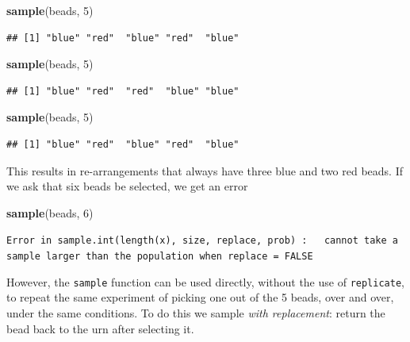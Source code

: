 \documentclass[
  openany]{book}
\newenvironment{Shaded}{\begin{snugshade}}{\end{snugshade}}
\newcommand{\DecValTok}[1]{\textcolor[rgb]{0.00,0.00,0.81}{#1}}
\newcommand{\KeywordTok}[1]{\textcolor[rgb]{0.13,0.29,0.53}{\textbf{#1}}}
\newcommand{\NormalTok}[1]{#1}
\begin{document}
\begin{Shaded}
\begin{Highlighting}[]
\KeywordTok{sample}\NormalTok{(beads, }\DecValTok{5}\NormalTok{)}
\end{Highlighting}
\end{Shaded}

\begin{verbatim}
## [1] "blue" "red"  "blue" "red"  "blue"
\end{verbatim}

\begin{Shaded}
\begin{Highlighting}[]
\KeywordTok{sample}\NormalTok{(beads, }\DecValTok{5}\NormalTok{)}
\end{Highlighting}
\end{Shaded}

\begin{verbatim}
## [1] "blue" "red"  "red"  "blue" "blue"
\end{verbatim}

\begin{Shaded}
\begin{Highlighting}[]
\KeywordTok{sample}\NormalTok{(beads, }\DecValTok{5}\NormalTok{)}
\end{Highlighting}
\end{Shaded}

\begin{verbatim}
## [1] "blue" "red"  "blue" "red"  "blue"
\end{verbatim}

This results in re-arrangements that always have three blue and two red beads. If we ask that six beads be selected, we get an error

\begin{Shaded}
\begin{Highlighting}[]
\KeywordTok{sample}\NormalTok{(beads, }\DecValTok{6}\NormalTok{)}
\end{Highlighting}
\end{Shaded}

\texttt{Error\ in\ sample.int(length(x),\ size,\ replace,\ prob)\ :\ \ \ cannot\ take\ a\ sample\ larger\ than\ the\ population\ when\ \textquotesingle{}replace\ =\ FALSE\textquotesingle{}}

However, the \texttt{sample} function can be used directly, without the use of \texttt{replicate}, to repeat the same experiment of picking one out of the 5 beads, over and over, under the same conditions. To do this we sample \emph{with replacement}: return the bead back to the urn after selecting it.
\end{document}
